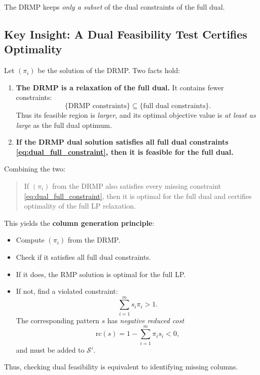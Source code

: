 \documentclass[11pt]{article}
\begin{document}
The DRMP keeps \emph{only a subset} of the dual constraints of the full dual.

\subsection{Key Insight: A Dual Feasibility Test Certifies Optimality}

Let $(\pi_i)$ be the solution of the DRMP.
Two facts hold:

\begin{enumerate}
    \item \textbf{The DRMP is a relaxation of the full dual.}  
          It contains fewer constraints:  
          \[
             \{\text{DRMP constraints}\} \subseteq
             \{\text{full dual constraints}\}.
          \]
          Thus its feasible region is \emph{larger}, and its optimal objective
          value is \emph{at least as large} as the full dual optimum.

    \item \textbf{If the DRMP dual solution satisfies all full dual constraints
          \eqref{eq:dual_full_constraint}, then it is feasible for the full dual.}
\end{enumerate}

Combining the two:
\begin{quote}
If $(\pi_i)$ from the DRMP also satisfies every missing constraint
\eqref{eq:dual_full_constraint}, then it is optimal for the full dual and
certifies optimality of the full LP relaxation.
\end{quote}

This yields the \textbf{column generation principle}:

\begin{itemize}
    \item Compute $(\pi_i)$ from the DRMP.
    \item Check if it satisfies all full dual constraints.
    \item If it does, the RMP solution is optimal for the full LP.
    \item If not, find a violated constraint:
    \[
        \sum_{i=1}^m s_i \pi_i > 1.
    \]
    The corresponding pattern $s$ has \emph{negative reduced cost}
    \[
        \text{rc}(s) = 1 - \sum_{i=1}^m \pi_i s_i < 0,
    \]
    and must be added to $\mathcal{S}'$.
\end{itemize}

Thus, checking dual feasibility is equivalent to identifying missing columns.
\end{document}
